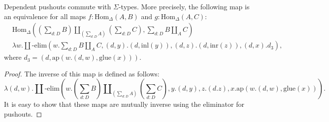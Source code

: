 \documentclass[reqno]{amsart}
\theoremstyle{definition}
\theoremstyle{remark}
\newcommand{\fs}[1]{\mathrm{#1}}
\newcommand{\Hom}{\fs{Hom}}
\newcommand{\pmap}{\fs{ap}}
\numberwithin{figure}{section}
\begin{document}
\begin{prop}
Dependent pushouts commute with $\Sigma$-types.
More precisely, the following map is an equivalence for all maps $f : \Hom_\Delta(A,B)$ and $g : \Hom_\Delta(A,C)$:
\begin{align*}
& \Hom_\Delta((\sum_{d : D} B) \amalg_{(\sum_{d : D} A)} (\sum_{d : D} C), \sum_{d : D} B \amalg_A C) \\
& \lambda w. \amalg\text{-}\fs{elim}(w. \sum_{d : D} B \amalg_A C, (d,y).(d,\fs{inl}(y)), (d,z).(d,\fs{inr}(z)), (d,x).d_3),
\end{align*}
where $d_3 = (d,\pmap(w.(d,w),\fs{glue}(x)))$.
\end{prop}
\begin{proof}
The inverse of this map is defined as follows:
\[ \lambda (d,w). \amalg\text{-}\fs{elim}(w. (\sum_{d : D} B) \amalg_{(\sum_{d : D} A)} (\sum_{d : D} C), y.(d,y), z.(d.z), x.\pmap(w.(d,w),\fs{glue}(x))). \]
It is easy to show that these maps are mutually inverse using the eliminator for pushouts.
\end{proof}
\end{document}
